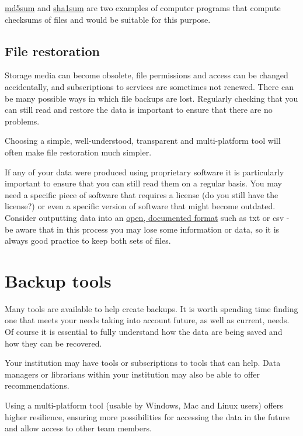 \documentclass[12pt,a4paper,oneside]{report}
\begin{document}
\href{https://en.wikipedia.org/wiki/Md5sum}{md5sum} and
\href{https://en.wikipedia.org/wiki/Sha1sum}{sha1sum} are two examples
of computer programs that compute checksums of files and would be
suitable for this purpose.

\hypertarget{file-restoration}{%
\subsection{File restoration}\label{file-restoration}}

Storage media can become obsolete, file permissions and access can be
changed accidentally, and subscriptions to services are sometimes not
renewed. There can be many possible ways in which file backups are lost.
Regularly checking that you can still read and restore the data is
important to ensure that there are no problems.

Choosing a simple, well-understood, transparent and multi-platform tool
will often make file restoration much simpler.

If any of your data were produced using proprietary software it is
particularly important to ensure that you can still read them on a
regular basis. You may need a specific piece of software that requires a
license (do you still have the license?) or even a specific version of
software that might become outdated. Consider outputting data into an
\protect\hyperlink{data-file-formats}{open, documented format} such as
txt or csv - be aware that in this process you may lose some information
or data, so it is always good practice to keep both sets of files.

\hypertarget{backup-tools}{%
\section{Backup tools}\label{backup-tools}}

Many tools are available to help create backups. It is worth spending
time finding one that meets your needs taking into account future, as
well as current, needs. Of course it is essential to fully understand
how the data are being saved and how they can be recovered.

Your institution may have tools or subscriptions to tools that can help.
Data managers or librarians within your institution may also be able to
offer recommendations.

Using a multi-platform tool (usable by Windows, Mac and Linux users)
offers higher resilience, ensuring more possibilities for accessing the
data in the future and allow access to other team members.
\end{document}
